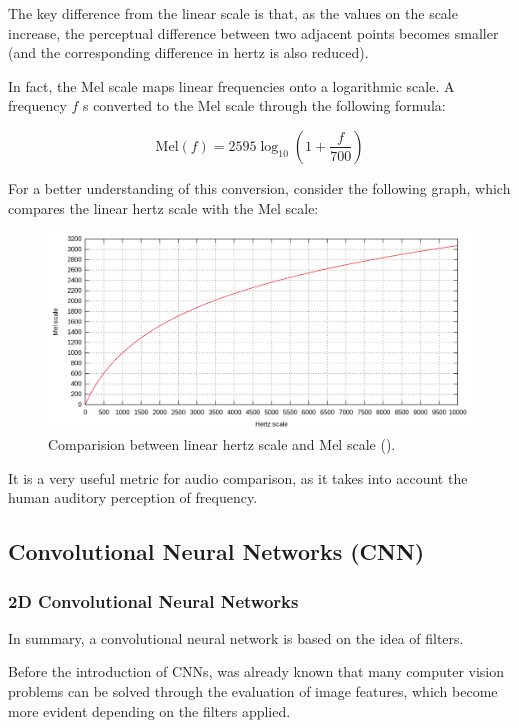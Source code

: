\documentclass[sigconf,natbib=false]{acmart}
\begin{document}
The key difference from the linear scale is that, as the values on the scale increase, the perceptual difference between two adjacent points becomes smaller (and the corresponding difference in hertz is also reduced).

In fact, the Mel scale maps linear frequencies onto a logarithmic scale. A frequency \( f \) s converted to the Mel scale through the following formula:

\[
\text{Mel}(f) = 2595 \log_{10} \left( 1 + \frac{f}{700} \right)
\]

For a better understanding of this conversion, consider the following graph, which compares the linear hertz scale with the Mel scale:

\begin{figure}[h]
 \centering
 \includegraphics[width=\linewidth]{figs/mel_scale.png}
 \caption{Comparision between linear hertz scale and Mel scale (\textcite{claesson2021resynthesis}).}
\end{figure}

It is a very useful metric for audio comparison, as it takes into account the human auditory perception of frequency.

\subsection{Convolutional Neural Networks (CNN)}

\subsubsection{2D Convolutional Neural Networks}

In summary, a convolutional neural network is based on the idea of filters.

Before the introduction of CNNs, was already known that many computer vision problems can be solved through the evaluation of image features, which become more evident depending on the filters applied.
\end{document}
